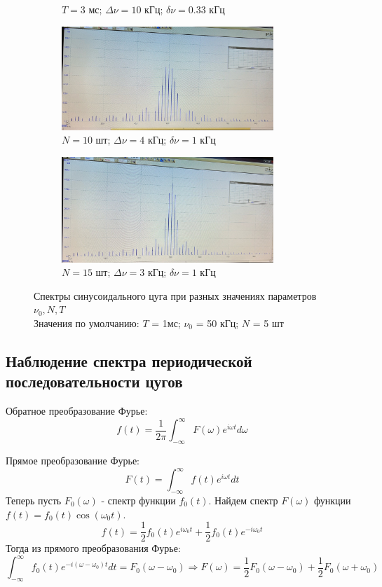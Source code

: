 \begin{figure}[h!]
\begin{subfigure}{0.48\linewidth}
        \caption{$T = 3$ мс; $\Delta\nu = 10$ кГц; $\delta\nu = 0.33$ кГц}
    \end{subfigure}
    \vfill
    \begin{subfigure}{0.48\linewidth}
        \centering
        \includegraphics[width=8cm]{./images/tusgi/3_10_4_1.jpg}
        \caption{$N = 10$ шт; $\Delta\nu = 4$ кГц; $\delta\nu = 1$ кГц}
    \end{subfigure}
    \hfill
    \begin{subfigure}{0.48\linewidth}
        \centering
        \includegraphics[width=8cm]{./images/tusgi/3_15_3_1.jpg}
        \caption{$N = 15$ шт; $\Delta\nu = 3$ кГц; $\delta\nu = 1$ кГц}
    \end{subfigure}
    \caption{Спектры синусоидального цуга при разных значениях параметров $\nu_0, N, T$\\Значения по умолчанию: $T$ = 1мс; $\nu_0$ = 50 кГц; $N$ = 5 шт}
\end{figure}

\newpage
\subsection*{Наблюдение спектра периодической последовательности цугов}
Обратное преобразование Фурье:
\begin{equation}
    f(t) = \frac{1}{2\pi}\int_{-\infty}^{\infty}F(\omega)e^{i\omega t}d\omega
\end{equation}

\noindent Прямое преобразование Фурье:
\begin{equation}
    F(t) = \int_{-\infty}^{\infty}f(t)e^{i\omega t}dt
\end{equation}
Теперь пусть $F_0(\omega)$ - спектр функции $f_0(t)$. Найдем спектр $F(\omega)$ функции $f(t) = f_0(t)\cos(\omega_0 t)$. $$f(t) = \frac{1}{2}f_0(t)e^{i\omega_0 t} + \frac{1}{2}f_0(t)e^{-i\omega_0 t}$$
Тогда из прямого преобразования Фурье:
$$\int_{-\infty}^{\infty}f_0(t)e^{-i(\omega - \omega_0)t}dt = F_0(\omega - \omega_0) \Rightarrow F(\omega) = \frac{1}{2}F_0(\omega - \omega_0) + \frac{1}{2}F_0(\omega + \omega_0)$$ 

